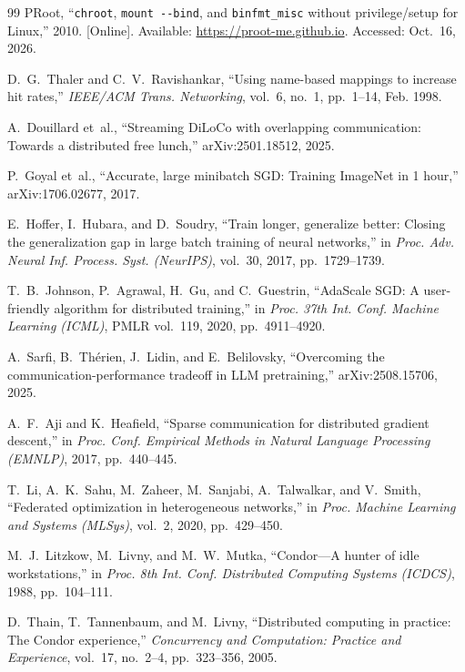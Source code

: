 {\begin{thebibliography}{99}
 PRoot, ``\texttt{chroot}, \texttt{mount -{}-bind}, and \texttt{binfmt\_misc} without privilege/setup for Linux,'' 2010. [Online]. Available: \url{https://proot-me.github.io}. Accessed: Oct.~16, 2026.

 D.~G.~Thaler and C.~V.~Ravishankar, ``Using name-based mappings to increase hit rates,'' \textit{IEEE/ACM Trans. Networking}, vol.~6, no.~1, pp.~1--14, Feb. 1998.

 A.~Douillard et~al., ``Streaming DiLoCo with overlapping communication: Towards a distributed free lunch,'' arXiv:2501.18512, 2025.

 P.~Goyal et~al., ``Accurate, large minibatch SGD: Training ImageNet in 1 hour,'' arXiv:1706.02677, 2017.

 E.~Hoffer, I.~Hubara, and D.~Soudry, ``Train longer, generalize better: Closing the generalization gap in large batch training of neural networks,'' in \textit{Proc. Adv. Neural Inf. Process. Syst. (NeurIPS)}, vol.~30, 2017, pp.~1729--1739.

 T.~B.~Johnson, P.~Agrawal, H.~Gu, and C.~Guestrin, ``AdaScale SGD: A user-friendly algorithm for distributed training,'' in \textit{Proc. 37th Int. Conf. Machine Learning (ICML)}, PMLR vol.~119, 2020, pp.~4911--4920.

 A.~Sarfi, B.~Th\'erien, J.~Lidin, and E.~Belilovsky, ``Overcoming the communication-performance tradeoff in LLM pretraining,'' arXiv:2508.15706, 2025.

 A.~F.~Aji and K.~Heafield, ``Sparse communication for distributed gradient descent,'' in \textit{Proc. Conf. Empirical Methods in Natural Language Processing (EMNLP)}, 2017, pp.~440--445.

 T.~Li, A.~K.~Sahu, M.~Zaheer, M.~Sanjabi, A.~Talwalkar, and V.~Smith, ``Federated optimization in heterogeneous networks,'' in \textit{Proc. Machine Learning and Systems (MLSys)}, vol.~2, 2020, pp.~429--450.

 M.~J.~Litzkow, M.~Livny, and M.~W.~Mutka, ``Condor---A hunter of idle workstations,'' in \textit{Proc. 8th Int. Conf. Distributed Computing Systems (ICDCS)}, 1988, pp.~104--111.

 D.~Thain, T.~Tannenbaum, and M.~Livny, ``Distributed computing in practice: The Condor experience,'' \textit{Concurrency and Computation: Practice and Experience}, vol.~17, no.~2--4, pp.~323--356, 2005.


\end{thebibliography}}
